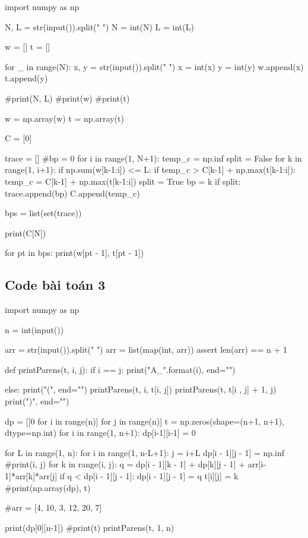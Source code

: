 \documentclass[14pt, a4paper]{article}
\theoremstyle{sltheorem}
\theoremstyle{soltheorem}
\begin{document}
\begin{python}
import numpy as np
            
N, L = str(input()).split(" ")
N = int(N)
L = int(L)
                        
w = []
t = []
                        
for _ in range(N):
    x, y = str(input()).split(" ")
    x = int(x)
    y = int(y)
    w.append(x)
    t.append(y)
                        
#print(N, L)
#print(w)
#print(t)
                        
w = np.array(w)
t = np.array(t)
                        
C = [0]
                        
trace = []
#bp = 0
for i in range(1, N+1):
    temp_c = np.inf
    split = False
    for k in range(1, i+1):
        if np.sum(w[k-1:i]) <= L:
            if temp_c > C[k-1] + np.max(t[k-1:i]):
                temp_c = C[k-1] + np.max(t[k-1:i])
                split = True
                bp = k
    if split:
        trace.append(bp)
    C.append(temp_c)
                        
bps = list(set(trace))
                        
print(C[N])
                        
for pt in bps:
    print(w[pt - 1], t[pt - 1])
\end{python}

\subsection{Code bài toán 3} \label{code-3-ex-3}

\begin{python}
import numpy as np

n = int(input())
    
arr = str(input()).split(" ")
arr = list(map(int, arr))
assert len(arr) == n + 1
    
def printParens(t, i, j):
    if i == j:
        print("A_{}".format(i), end="")
    
    else:
        print("(", end="")
        printParens(t, i, t[i, j])
        printParens(t, t[i , j] + 1, j)
        print(")", end="")
    
    
dp = [[0 for i in range(n)] for j in range(n)]
t = np.zeros(shape=(n+1, n+1), dtype=np.int)
for i in range(1, n+1):
    dp[i-1][i-1] = 0
        
for L in range(1, n):
    for i in range(1, n-L+1):
        j = i+L
        dp[i - 1][j - 1] = np.inf
        #print(i, j)
        for k in range(i, j):
            q = dp[i - 1][k - 1] + dp[k][j - 1] + arr[i-1]*arr[k]*arr[j]
            if q < dp[i - 1][j - 1]:
                dp[i - 1][j - 1] = q
                t[i][j] = k
#print(np.array(dp), t)
    
#arr = [4, 10, 3, 12, 20, 7]
    
    
print(dp[0][n-1])
#print(t)
printParens(t, 1, n)
\end{python}
\end{document}
